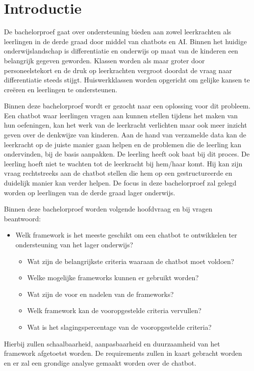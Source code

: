
\section{Introductie}%
\label{sec:introductie}

De bachelorproef gaat over ondersteuning bieden aan zowel leerkrachten als leerlingen in de derde graad door middel van chatbots en AI. 
Binnen het huidige onderwijslandschap is differentiatie en onderwijs op maat van de kinderen een belangrijk gegeven geworden. 
Klassen worden als maar groter door personeelstekort en de druk op leerkrachten vergroot doordat de vraag naar differentiatie steeds stijgt. 
Huiswerkklassen worden opgericht om gelijke kansen te creëren en leerlingen te ondersteunen.
 
Binnen deze bachelorproef wordt er gezocht naar een oplossing voor dit probleem. 
Een chatbot waar leerlingen vragen aan kunnen stellen tijdens het maken van hun oefeningen, kan het werk van de leerkracht verlichten maar ook meer inzicht geven over de denkwijze van kinderen. 
Aan de hand van verzamelde data kan de leerkracht op de juiste manier gaan helpen en de problemen die de leerling kan ondervinden, bij de basis aanpakken. 
De leerling heeft ook baat bij dit proces. 
De leerling hoeft niet te wachten tot de leerkracht bij hem/haar komt. 
Hij kan zijn vraag rechtstreeks aan de chatbot stellen die hem op een gestructureerde en duidelijk manier kan verder helpen. 
De focus in deze bachelorproef zal gelegd worden op leerlingen van de derde graad lager onderwijs. 

Binnen deze bachelorproef worden volgende hoofdvraag en bij vragen beantwoord: 
\begin{itemize}
\item Welk framework is het meeste geschikt om een chatbot te ontwikkelen ter ondersteuning van het lager onderwijs? 
\begin{itemize}
\item Wat zijn de belangrijkste criteria waaraan de chatbot moet voldoen?
\item Welke mogelijke frameworks kunnen er gebruikt worden? 
\item Wat zijn de voor en nadelen van de frameworks?
\item Welk framework kan de vooropgestelde criteria vervullen? 
\item Wat is het slagingspercentage van de vooropgestelde criteria?
\end{itemize}
\end{itemize}
Hierbij zullen schaalbaarheid, aanpasbaarheid en duurzaamheid van het framework afgetoetst worden. 
De requirements zullen in kaart gebracht worden en er zal een grondige analyse gemaakt worden over de chatbot. 

